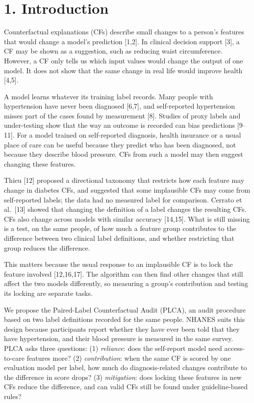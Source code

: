 \documentclass[
  11pt,
]{article}
\begin{document}
\section{1. Introduction}

Counterfactual explanations (CFs) describe small changes to a person's
features that would change a model's prediction {[}1,2{]}. In clinical
decision support {[}3{]}, a CF may be shown as a suggestion, such as
reducing waist circumference. However, a CF only tells us which input
values would change the output of one model. It does not show that the
same change in real life would improve health {[}4,5{]}.

A model learns whatever its training label records. Many people with
hypertension have never been diagnosed {[}6,7{]}, and self-reported
hypertension misses part of the cases found by measurement {[}8{]}.
Studies of proxy labels and under-testing show that the way an outcome
is recorded can bias predictions {[}9--11{]}. For a model trained on
self-reported diagnosis, health insurance or a usual place of care can
be useful because they predict who has been diagnosed, not because they
describe blood pressure. CFs from such a model may then suggest changing
these features.

Thieu {[}12{]} proposed a directional taxonomy that restricts how each
feature may change in diabetes CFs, and suggested that some implausible
CFs may come from self-reported labels; the data had no measured label
for comparison. Cerrato et al.~{[}13{]} showed that changing the
definition of a label changes the resulting CFs. CFs also change across
models with similar accuracy {[}14,15{]}. What is still missing is a
test, on the same people, of how much a feature group contributes to the
difference between two clinical label definitions, and whether
restricting that group reduces the difference.

This matters because the usual response to an implausible CF is to lock
the feature involved {[}12,16,17{]}. The algorithm can then find other
changes that still affect the two models differently, so measuring a
group's contribution and testing its locking are separate tasks.

We propose the Paired-Label Counterfactual Audit (PLCA), an audit
procedure based on two label definitions recorded for the same people.
NHANES suits this design because participants report whether they have
ever been told that they have hypertension, and their blood pressure is
measured in the same survey. PLCA asks three questions: (1)
\emph{reliance}: does the self-report model need access-to-care features
more? (2) \emph{contribution}: when the same CF is scored by one
evaluation model per label, how much do diagnosis-related changes
contribute to the difference in score drops? (3) \emph{mitigation}: does
locking these features in new CFs reduce the difference, and can valid
CFs still be found under guideline-based rules?
\end{document}
